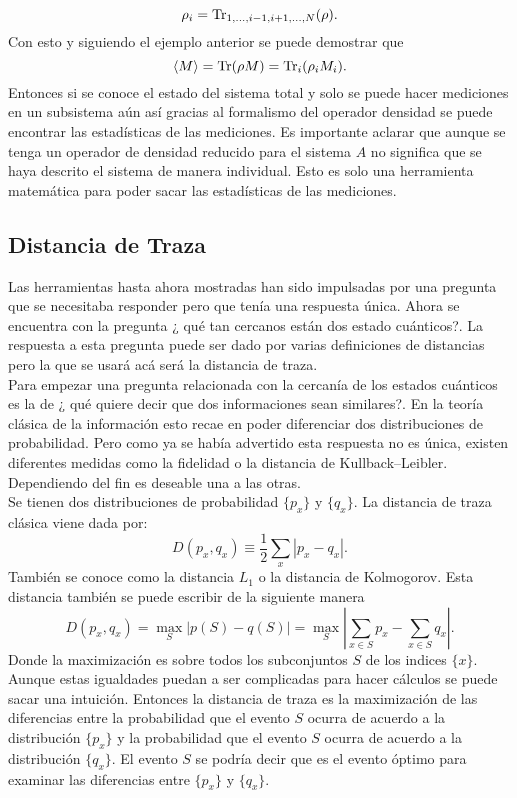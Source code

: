 \begin{equation}
\rho_{i}= \Tr_{1,...,i-1,i+1,...,N}(\rho).
\end{equation}
Con esto y siguiendo el ejemplo anterior se puede demostrar que 
\begin{equation}
\langle M \rangle = \Tr(\rho M)=\Tr_{i}(\rho_{i} M_{i}).
\end{equation}
Entonces si se conoce el estado del sistema total y solo se puede hacer mediciones en un subsistema aún así gracias al formalismo del operador densidad se puede encontrar las estadísticas de las mediciones. Es importante aclarar que aunque se tenga un operador de densidad reducido para el sistema $A$ no significa que se haya descrito el sistema de manera individual. Esto es solo una herramienta matemática para poder sacar las estadísticas de las mediciones.
\subsection{Distancia de Traza}
Las herramientas hasta ahora mostradas han sido impulsadas por una pregunta que se necesitaba responder pero que tenía una respuesta única. Ahora se encuentra con la pregunta ¿ qué tan cercanos están dos estado cuánticos?. La respuesta a esta pregunta puede ser dado por varias definiciones de distancias pero la que se usará acá será la distancia de traza.
\\
Para empezar una pregunta relacionada con la cercanía de los estados cuánticos es la de ¿ qué quiere decir que dos informaciones sean similares?. En la teoría clásica de la información esto recae en poder diferenciar dos distribuciones de probabilidad. Pero como ya se había advertido esta respuesta no es única, existen diferentes medidas como la fidelidad o la distancia de Kullback–Leibler. Dependiendo del fin es deseable una a las otras.
\\
Se tienen dos distribuciones de probabilidad $\{ p_{x} \}$ y $\{ q_{x} \}$. La distancia de  traza clásica viene dada por:
\begin{equation}
D(p_{x},q_{x})\equiv \frac{1}{2} \sum_{x}|p_{x}-q_{x}|.
\end{equation}
También se conoce como la distancia $L_{1}$ o la distancia de Kolmogorov. Esta distancia también se puede escribir de la siguiente manera 
\begin{equation}
D(p_{x},q_{x})= \max_{S} |p(S)-q(S)|= \max_{S} |\sum_{x \in S}p_{x}-\sum_{x \in S}q_{x}|.
\end{equation}
Donde la maximización es sobre todos los subconjuntos $S$ de los indices $\{ x \}$. Aunque estas igualdades puedan a ser complicadas para hacer cálculos se puede sacar una intuición. Entonces la distancia de traza es la maximización  de las diferencias entre la probabilidad que el evento $S$ ocurra de acuerdo a la distribución $\{p_{x} \}$ y la probabilidad que el evento $S$ ocurra de acuerdo a la distribución $\{q_{x} \}$. El evento $S$ se podría decir que es el evento óptimo para examinar las diferencias entre $\{p_{x} \}$ y $\{q_{x} \}$.
